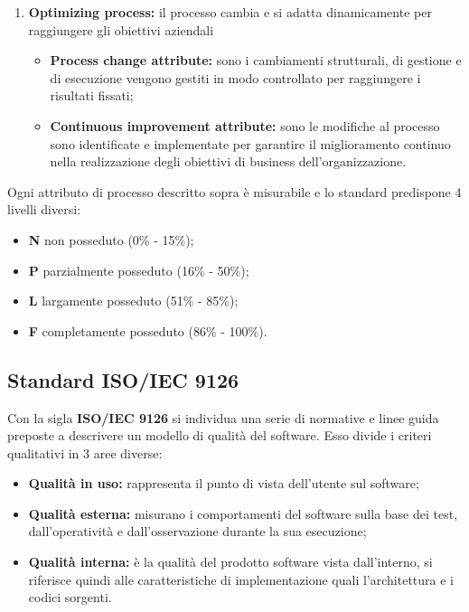 \begin{enumerate}[label*=\arabic*]
\item \textbf{Optimizing process:} il processo cambia e si adatta dinamicamente per raggiungere gli obiettivi aziendali
		\begin{itemize}
			\item \textbf{Process change attribute:} sono i cambiamenti strutturali, di gestione e di esecuzione vengono gestiti in modo controllato per raggiungere i risultati fissati;
			\item \textbf{Continuous improvement attribute:} sono le modifiche al processo sono identificate e implementate per garantire il miglioramento continuo nella realizzazione degli obiettivi di business dell'organizzazione.
		\end{itemize}

\end{enumerate}

\noindent Ogni attributo di processo descritto sopra è misurabile e lo standard predispone 4 livelli diversi:
\begin{itemize}[label={}]
	\item \textbf{N} non posseduto (0\% - 15\%);
	\item \textbf{P} parzialmente posseduto (16\% - 50\%);
	\item \textbf{L} largamente posseduto (51\% - 85\%);
	\item \textbf{F} completamente posseduto (86\% - 100\%).
\end{itemize}

\subsection{Standard ISO/IEC 9126} \label{9126}
Con la sigla \textbf{ISO/IEC 9126} si individua una serie di normative e linee guida preposte a descrivere un modello di qualità del software.
Esso divide i criteri qualitativi in 3 aree diverse:
\begin{itemize}

	\item \textbf{Qualità in uso:} rappresenta il punto di vista dell'utente sul software;
	\item \textbf{Qualità esterna:} misurano i comportamenti del software sulla base dei test, dall'operatività e dall'osservazione durante la sua esecuzione;
	\item \textbf{Qualità interna:} è la qualità del prodotto software vista dall'interno, si riferisce quindi alle caratteristiche di implementazione quali l'architettura e i codici sorgenti.
\end{itemize}

